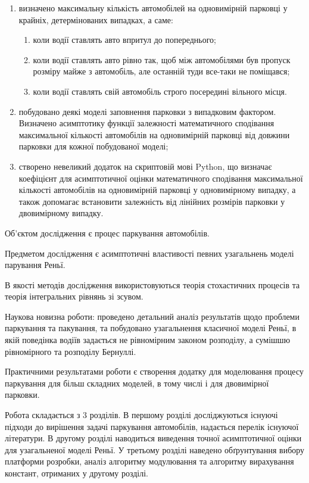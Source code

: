 \begin{enumerate}
	\item визначено максимальну кількість автомобілей на одновимірній парковці у крайніх, 			детермінованих випадках, а саме:
	\begin{enumerate}
		\item коли водії ставлять авто впритул до попереднього;
		\item коли водії ставлять авто рівно так, щоб між автомобілями був пропуск розміру 			майже з автомобіль, але останній туди все-таки не поміщався;
		\item коли водії ставлять свій автомобіль строго посередині вільного місця.
	\end{enumerate}
        	\item побудовано деякі моделі заповнення парковки з випадковим фактором. Визначено 		асимптотику функції залежності математичного сподівання максимальної кількості 		автомобілів на одновимірній парковці від довжини парковки для кожної побудованої моделі;
	\item створено невеликий додаток на скриптовій мові Python, що визначає коефіцієнт для 		асимптотичної оцінки математичного сподівання максимальної кількості автомобілів на 		одновимірній парковці у одновимірному випадку, а також допомагає встановити 			залежність від лінійних розмірів парковки у двовимірному випадку.
\end{enumerate}

Об'єктом дослідження є процес паркування автомобілів.

Предметом дослідження є асимптотичні властивості певних узагальнень моделі парування Реньї.

В якості методів дослідження використовуються теорія стохастичних процесів та теорія інтегральних рівнянь зі зсувом.

Наукова новизна роботи: проведено детальний аналіз результатів щодо проблеми паркування та пакування, та побудовано узагальнення класичної моделі Реньї, в якій поведінка водіїв задається не рівномірним законом розподілу, а сумішшю рівномірного та розподілу Бернуллі.

Практичними результатами роботи є створення додатку для моделювання процесу паркування для більш складних моделей, в тому числі і для двовимірної парковки.

Робота складається з 3 розділів. В першому розділі досліджуються існуючі підходи до вирішення задачі паркування автомобілів, надається перелік існуючої літератури. В другому розділі наводиться виведення точної асимптотичної оцінки для узагальненої моделі Реньї. У третьому розділі наведено обґрунтування вибору платформи розробки, аналіз алгоритму модулювання та алгоритму вирахування констант, отриманих у другому розділі.